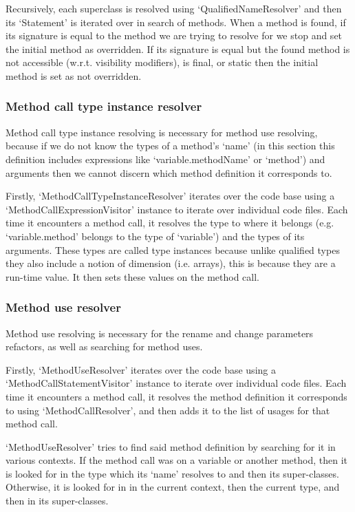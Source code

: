 \documentclass[12pt, letterpaper]{article}
\begin{document}
Recursively, each superclass is resolved using `QualifiedNameResolver' and then its `Statement' is iterated over in search of methods.
When a method is found, if its signature is equal to the method we are trying to resolve for we stop and set the initial method as overridden.
If its signature is equal but the found method is not accessible (w.r.t. visibility modifiers), is final, or static then the initial method is set as not overridden.

\subsubsection{Method call type instance resolver}
Method call type instance resolving is necessary for method use resolving, because if we do not know the types of a method's `name' (in this section this definition includes expressions like `variable.methodName' or `method') and arguments then we cannot discern which method definition it corresponds to.

Firstly, `MethodCallTypeInstanceResolver' iterates over the code base using a `MethodCallExpressionVisitor' instance to iterate over individual code files.
Each time it encounters a method call, it resolves the type to where it belongs (e.g. `variable.method' belongs to the type of `variable') and the types of its arguments.
These types are called type instances because unlike qualified types they also include a notion of dimension (i.e. arrays), this is because they are a run-time value.
It then sets these values on the method call.

\subsubsection{Method use resolver}
Method use resolving is necessary for the rename and change parameters refactors, as well as searching for method uses.

Firstly, `MethodUseResolver' iterates over the code base using a `MethodCallStatementVisitor' instance to iterate over individual code files.
Each time it encounters a method call, it resolves the method definition it corresponds to using `MethodCallResolver', and then adds it to the list of usages for that method call.

`MethodUseResolver' tries to find said method definition by searching for it in various contexts.
If the method call was on a variable or another method, then it is looked for in the type which its `name' resolves to and then its super-classes.
Otherwise, it is looked for in in the current context, then the current type, and then in its super-classes.
\end{document}
